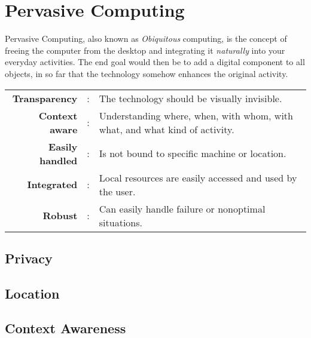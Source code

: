 \section{Pervasive Computing} \label{sec;pervasive_computing}  
Pervasive Computing, also known as \emph{Obiquitous} computing, is the concept of freeing the computer from the desktop and integrating it \emph{naturally} into your everyday activities. The end goal would then be to add a digital component to all objects, in so far that the technology somehow enhances the original activity.

\begin{longtable}{rc>{\raggedright\arraybackslash}p{}}
  \textbf{Transparency} & : &
  The technology should be visually invisible.
  \\ \textbf{Context aware} & : &
  Understanding where, when, with whom, with what, and what kind of activity.
  \\ \textbf{Easily handled} & : &
  Is not bound to specific machine or location.
  \\ \textbf{Integrated} & : &
  Local resources are easily accessed and used by the user.
  \\ \textbf{Robust} & : &
  Can easily handle failure or nonoptimal situations.
\end{longtable}



\subsection{Privacy}


\subsection{Location}


\subsection{Context Awareness}



